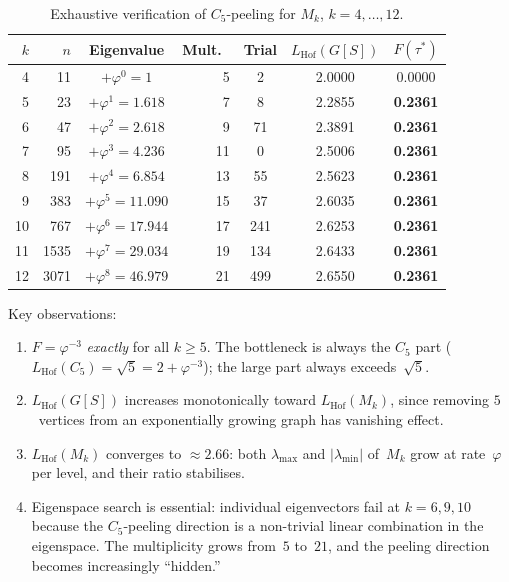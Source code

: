 \documentclass[11pt,a4paper]{amsart}
\theoremstyle{plain}
\theoremstyle{definition}
\theoremstyle{remark}
\newcommand{\vp}{\varphi}
\newcommand{\LHof}{L_{\mathrm{Hof}}}
\begin{document}
\begin{table}[ht]
\centering
\caption{Exhaustive verification of $C_5$-peeling for $M_k$, $k = 4,\ldots,12$.}
\label{tab:verification}
\begin{tabular}{@{}rrcrccc@{}}
\toprule
$k$ & $n$ & Eigenvalue & Mult.\ & Trial & $\LHof(G[S])$ & $F(\tau^*)$ \\
\midrule
 4 &   11 & $+\vp^0 = 1$       &  5 &   2 & 2.0000 & 0.0000 \\
 5 &   23 & $+\vp^1 = 1.618$   &  7 &   8 & 2.2855 & \textbf{0.2361} \\
 6 &   47 & $+\vp^2 = 2.618$   &  9 &  71 & 2.3891 & \textbf{0.2361} \\
 7 &   95 & $+\vp^3 = 4.236$   & 11 &   0 & 2.5006 & \textbf{0.2361} \\
 8 &  191 & $+\vp^4 = 6.854$   & 13 &  55 & 2.5623 & \textbf{0.2361} \\
 9 &  383 & $+\vp^5 = 11.090$  & 15 &  37 & 2.6035 & \textbf{0.2361} \\
10 &  767 & $+\vp^6 = 17.944$  & 17 & 241 & 2.6253 & \textbf{0.2361} \\
11 & 1535 & $+\vp^7 = 29.034$  & 19 & 134 & 2.6433 & \textbf{0.2361} \\
12 & 3071 & $+\vp^8 = 46.979$  & 21 & 499 & 2.6550 & \textbf{0.2361} \\
\bottomrule
\end{tabular}
\end{table}

Key observations:
\begin{enumerate}[(1)]
\item $F = \vp^{-3}$ \emph{exactly} for all $k \geq 5$.  The bottleneck is
  always the $C_5$ part ($\LHof(C_5) = \sqrt{5} = 2 + \vp^{-3}$); the large
  part always exceeds~$\sqrt{5}$.
\item $\LHof(G[S])$ increases monotonically toward $\LHof(M_k)$, since removing
  $5$~vertices from an exponentially growing graph has vanishing effect.
\item $\LHof(M_k)$ converges to $\approx 2.66$: both $\lambda_{\max}$ and
  $|\lambda_{\min}|$ of~$M_k$ grow at rate~$\vp$ per level, and their ratio
  stabilises.
\item Eigenspace search is essential: individual eigenvectors fail at
  $k = 6, 9, 10$ because the $C_5$-peeling direction is a non-trivial linear
  combination in the eigenspace.  The multiplicity grows from~$5$ to~$21$, and
  the peeling direction becomes increasingly ``hidden.''
\end{enumerate}
\end{document}
